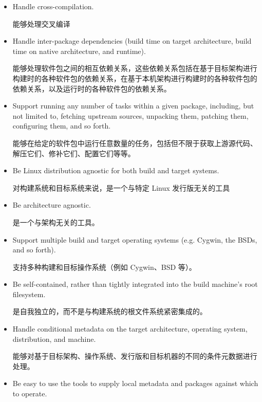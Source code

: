 \begin{itemize}
\setlength\itemsep{1.0em}

\item Handle cross-compilation.

\medskip
能够处理交叉编译

\item Handle inter-package dependencies (build time on target architecture, build time on native architecture, and runtime).

\medskip
能够处理软件包之间的相互依赖关系，这些依赖关系包括在基于目标架构进行构建时的各种软件包的依赖关系，在基于本机架构进行构建时的各种软件包的依赖关系，以及运行时的各种软件包的依赖关系。

\item Support running any number of tasks within a given package, including, but not limited to, fetching upstream sources, unpacking them, patching them, configuring them, and so forth.

\medskip
能够在给定的软件包中运行任意数量的任务，包括但不限于获取上游源代码、解压它们、修补它们、配置它们等等。

\item Be Linux distribution agnostic for both build and target systems.

\medskip
对构建系统和目标系统来说，是一个与特定 Linux 发行版无关的工具

\item Be architecture agnostic.

\medskip
是一个与架构无关的工具。

\item Support multiple build and target operating systems (e.g. Cygwin, the BSDs, and so forth).

\medskip
支持多种构建和目标操作系统（例如 Cygwin、BSD 等）。

\item Be self-contained, rather than tightly integrated into the build machine's root filesystem.

\medskip
是自我独立的，而不是与构建系统的根文件系统紧密集成的。

\item Handle conditional metadata on the target architecture, operating system, distribution, and machine.

\medskip
能够对基于目标架构、操作系统、发行版和目标机器的不同的条件元数据进行处理。

\item Be easy to use the tools to supply local metadata and packages against which to operate.


\end{itemize}
